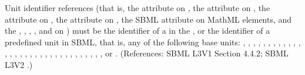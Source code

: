 Unit identifier references (that is, the  attribute on \Compartment, the
 attribute on \Parameter, the  attribute on \LocalParameter, the  attribute
on \Species, the SBML  attribute on MathML 
elements, and the , ,
, ,  and
 on \Model) must be the identifier of a \UnitDefinition in the \Model, or the identifier of a predefined unit in SBML, that is, any of the following base units:  
,
,
,
,
,
,
,
,
,
,
,
,
,
,
,
,
,
,
,
,
,
,
,
,
,
,
,
,
,
,
,
, or
.
(References: SBML L3V1 Section 4.4.2; SBML L3V2 .)

